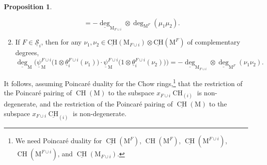 \documentclass[11pt,reqno]{amsart}
\theoremstyle{definition}
\newtheorem{proposition}[theorem]{Proposition}
\theoremstyle{remark}
\renewcommand{\(}{\left(}
\renewcommand{\)}{\right)}
\newcommand{\<}{\left<}
\renewcommand{\>}{\right>}
\newcommand{\CH}{\operatorname{CH}}
\newcommand{\uCH}{\underline{\CH}}
\begin{document}
\begin{proposition}
\begin{enumerate}[(1)]
\[=-\underline\deg_{\mathrm{M}_{F\cup i}} \otimes \deg_{\mathrm{M}^{F}}(\mu_1 \mu_2).
\]
\item If $F\in \underline{\mathscr{S}}_i$, 
then for any $\nu_1, \nu_2\in \underline{\mathrm{CH}}(\mathrm{M}_{F\cup i}) \otimes \underline{\mathrm{CH}}(\mathrm{M}^{F})$ of complementary degrees,
\[
\underline\deg_{\mathrm{M}}\big(\underline\psi^{F\cup i}_{\mathrm{M}}\big( 1 \otimes  \underline\theta_i^{F \cup i}(\nu_1)\big)\cdot \underline\psi^{F\cup i}_{\mathrm{M}}\big( 1 \otimes  \underline\theta_i^{F \cup i}(\nu_2)\big) \big)
=-\underline\deg_{\mathrm{M}_{F\cup i}} \otimes \underline\deg_{\mathrm{M}^{F}}( \nu_1\nu_2).
\]
\end{enumerate}
\end{proposition}

It follows, assuming Poincar\'e duality for the Chow rings,\footnote{We need Poincar\'e duality for $\uCH(\mathrm{M}^F)$, $\CH(\mathrm{M}^F)$,  $\uCH(\mathrm{M}^{F \cup i})$, $\CH(\mathrm{M}^{F \cup i})$,  and
$\uCH(\mathrm{M}_{F \cup i})$.} that
the restriction of the Poincar\'e pairing of $\CH(\mathrm{M})$ to the subspace $x_{F \cup i} \CH_{(i)}$ is non-degenerate, 
and the restriction of the Poincar\'e pairing of $\uCH(\mathrm{M})$ to the subspace  $x_{F \cup i} \uCH_{(i)}$
is non-degenerate. %
\end{document}
